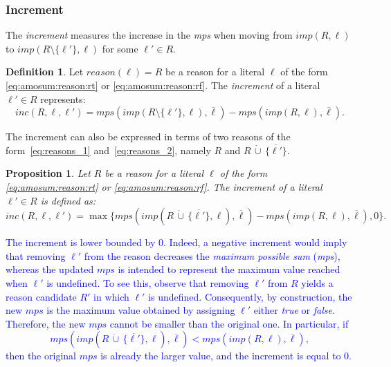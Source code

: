 \documentclass[preprint,authoryear]{elsarticle}
\newcommand{\mps}{\mathit{mps}}
\newcommand{\cupdot}{\,\dot{\cup}\,}
\newtheorem{proposition}{Proposition}[section]
\theoremstyle{definition}
\newtheorem{definition}{Definition}[section]
\begin{document}
\subsubsection*{Increment}
\label{sec:increment}
{\color{blue}
The \textit{increment} measures the increase in the \textit{mps} when moving from $\mathit{imp}(R, \ell)$ to $\mathit{imp}(R \setminus \{\ell'\}, \ell)$ for some $\ell' \in R$.
\begin{definition}
    \label{prop:inc}
        Let $\mathit{reason}(\ell) = R$ be a reason for a literal $\ell$ of the form \eqref{eq:amosum:reason:rt} or \eqref{eq:amosum:reason:rf}.
    The \emph{increment} of a literal $\ell' \in R$ represents:
    $$\mathit{inc}(R, \ell, \ell') = \mps(\mathit{imp}({R \setminus \{ \ell' \}},\ell),\overline{\ell}) - \mps(\mathit{imp}(R,\ell),\overline{\ell}).$$
\end{definition}
}

The increment can also be expressed in terms of two reasons of the form~\eqref{eq:reasons_1} and~\eqref{eq:reasons_2}, namely $R$ and $R \cupdot \{\overline{\ell'}\}$.
\begin{proposition}
    Let $R$ be a reason for a literal $\ell$ of the form \eqref{eq:amosum:reason:rt} or \eqref{eq:amosum:reason:rf}.
    The \emph{increment} of a literal $\ell' \in R$ is defined as:
    $$\mathit{inc}(R, \ell, \ell') = \max\{mps(\mathit{imp}({R \cupdot \{ {\overline{\ell'}} \}},\ell),\overline{\ell}) - mps(\mathit{imp}({R},\ell),\overline{\ell}),0\}.$$
\end{proposition}
\textcolor{blue}{The increment is lower bounded by $0$. Indeed, a negative increment would imply that removing $\ell'$ from the reason decreases the \textit{maximum possible sum} (\textit{mps}), whereas the updated $\mps$ is intended to represent the maximum value reached when $\ell'$ is undefined.
To see this, observe that removing $\ell'$ from $R$ yields a reason candidate $R'$ in which $\ell'$ is undefined. Consequently, by construction, the new $\mps$ is the maximum value obtained by assigning $\ell'$ either \textit{true} or \textit{false}. Therefore, the new $\mps$ cannot be smaller than the original one. In particular, if
$$
\mps(\mathit{imp}(R \cupdot \{\overline{\ell'}\},\ell), \overline{\ell})
<
\mps(\mathit{imp}(R,\ell),\overline{\ell}),
$$
then the original $\mps$ is already the larger value, and the increment is equal to $0$.}
\end{document}
